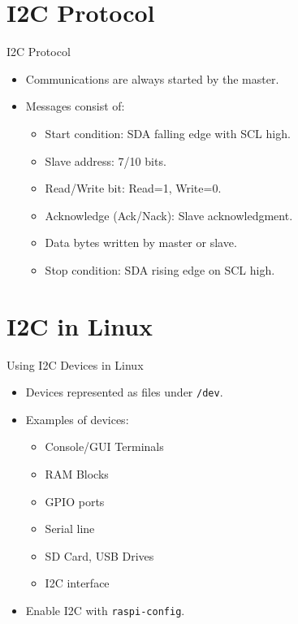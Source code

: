 \section{I2C Protocol}
\begin{frame}{I2C Protocol}
    \begin{itemize}
        \item Communications are always started by the master.
        \item Messages consist of:
        \begin{itemize}
            \item Start condition: SDA falling edge with SCL high.
            \item Slave address: 7/10 bits.
            \item Read/Write bit: Read=1, Write=0.
            \item Acknowledge (Ack/Nack): Slave acknowledgment.
            \item Data bytes written by master or slave.
            \item Stop condition: SDA rising edge on SCL high.
        \end{itemize}
    \end{itemize}
\end{frame}

\section{I2C in Linux}
\begin{frame}{Using I2C Devices in Linux}
    \begin{itemize}
        \item Devices represented as files under \texttt{/dev}.
        \item Examples of devices:
        \begin{itemize}
            \item Console/GUI Terminals
            \item RAM Blocks
            \item GPIO ports
            \item Serial line
            \item SD Card, USB Drives
            \item I2C interface
        \end{itemize}
        \item Enable I2C with \texttt{raspi-config}.
    \end{itemize}
\end{frame}

